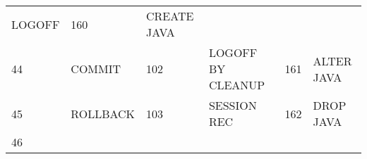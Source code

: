 \begin{longtable}[]{@{}llllll@{}}
\begin{minipage}[t]{0.24\columnwidth}
LOGOFF\strut
\end{minipage} & \begin{minipage}[t]{0.06\columnwidth}\raggedright\strut
160\strut
\end{minipage} & \begin{minipage}[t]{0.24\columnwidth}\raggedright\strut
CREATE JAVA\strut
\end{minipage}\tabularnewline
\begin{minipage}[t]{0.06\columnwidth}\raggedright\strut
44\strut
\end{minipage} & \begin{minipage}[t]{0.19\columnwidth}\raggedright\strut
COMMIT\strut
\end{minipage} & \begin{minipage}[t]{0.06\columnwidth}\raggedright\strut
102\strut
\end{minipage} & \begin{minipage}[t]{0.24\columnwidth}\raggedright\strut
LOGOFF BY CLEANUP\strut
\end{minipage} & \begin{minipage}[t]{0.06\columnwidth}\raggedright\strut
161\strut
\end{minipage} & \begin{minipage}[t]{0.24\columnwidth}\raggedright\strut
ALTER JAVA\strut
\end{minipage}\tabularnewline
\begin{minipage}[t]{0.06\columnwidth}\raggedright\strut
45\strut
\end{minipage} & \begin{minipage}[t]{0.19\columnwidth}\raggedright\strut
ROLLBACK\strut
\end{minipage} & \begin{minipage}[t]{0.06\columnwidth}\raggedright\strut
103\strut
\end{minipage} & \begin{minipage}[t]{0.24\columnwidth}\raggedright\strut
SESSION REC\strut
\end{minipage} & \begin{minipage}[t]{0.06\columnwidth}\raggedright\strut
162\strut
\end{minipage} & \begin{minipage}[t]{0.24\columnwidth}\raggedright\strut
DROP JAVA\strut
\end{minipage}\tabularnewline
\begin{minipage}[t]{0.06\columnwidth}\raggedright\strut
46\strut
\end{minipage} & \begin{minipage}[t]{0.19\columnwidth}\raggedright\strut

\end{minipage}
\end{longtable}
